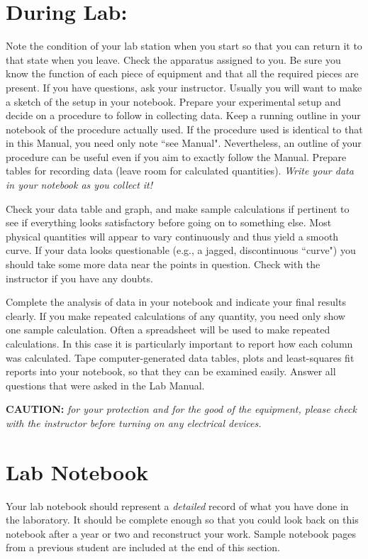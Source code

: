 \section*{During Lab:}

Note the condition of
your lab station when you start so that you can return it to that state when you leave.
Check the apparatus assigned to you.  Be sure you know the function of
each piece of equipment and that all the required pieces are present.
If you have questions, ask your instructor.  Usually you will want
to make a sketch of the setup in your notebook.
Prepare your
experimental setup and decide on a procedure to follow in
collecting data.  
Keep a running outline in your notebook of the procedure actually used.
If the procedure used is identical to that in this Manual,
you need only note ``see Manual".  Nevertheless, an outline of your
procedure can be useful even if you aim to exactly follow the Manual.
Prepare
tables for recording data (leave room for calculated quantities).
{\em Write your data in your notebook as you collect it!}  

Check your data table and graph, and make sample calculations if
pertinent to see if everything looks satisfactory before going on
to something else.  Most physical quantities will appear to vary
continuously and thus yield a smooth curve.  If your data looks
questionable (e.g., a jagged, discontinuous ``curve") you should take
some more data near the points in question.  Check with the instructor 
if you have any doubts.

Complete the analysis of data in your notebook and
 indicate your final results clearly.  If you make repeated calculations
 of any quantity, you need only show one sample calculation.  
Often a spreadsheet will be used to make repeated calculations.
In this case it is particularly important to report how each column was
calculated.  
Tape computer-generated data tables, plots and least-squares fit
reports into your notebook, so that they can be examined
easily.  Answer all questions that were asked in the Lab Manual.

{\bf CAUTION:}  {\em for your protection and for the good of the
equipment, please check with the instructor before turning on
any electrical devices.}

 \section*{Lab Notebook}

Your lab notebook should represent a {\em detailed} record of what
you have done in the laboratory.   It should be complete enough
so that you could look back on this notebook after a year or two and
reconstruct your work.    Sample notebook
pages from a previous student are included at the end of this
section.

